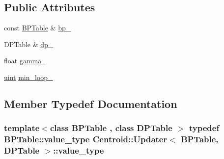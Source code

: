 \subsection*{Public Attributes}
\begin{DoxyCompactItemize}
\item 
const \hyperlink{folding__engine_8h_a065821fb17bbd8df315f2435c973e3c1}{B\+P\+Table} \& \hyperlink{struct_centroid_1_1_updater_a9769d7141589366c4e6d031b267c8dc4}{bp\+\_\+}
\item 
D\+P\+Table \& \hyperlink{struct_centroid_1_1_updater_ad9d56e0acfb53e8a044c674aa9044381}{dp\+\_\+}
\item 
float \hyperlink{struct_centroid_1_1_updater_a3dd3233bf978ca8c9b5b7d424120b777}{gamma\+\_\+}
\item 
\hyperlink{cyktable_8h_a91ad9478d81a7aaf2593e8d9c3d06a14}{uint} \hyperlink{struct_centroid_1_1_updater_a8de12893eea4e0759964678717585026}{min\+\_\+loop\+\_\+}
\end{DoxyCompactItemize}


\subsection{Member Typedef Documentation}
\hypertarget{struct_centroid_1_1_updater_a2cee1d3de499b9e7ccd74269e0e6a9f1}{
\subsubsection[{value\+\_\+type}]{\setlength{\rightskip}{0pt plus 5cm}template$<$class B\+P\+Table , class D\+P\+Table $>$ typedef {\bf B\+P\+Table\+::value\+\_\+type} {\bf Centroid\+::\+Updater}$<$ {\bf B\+P\+Table}, D\+P\+Table $>$\+::{\bf value\+\_\+type}}}\label{struct_centroid_1_1_updater_a2cee1d3de499b9e7ccd74269e0e6a9f1}


